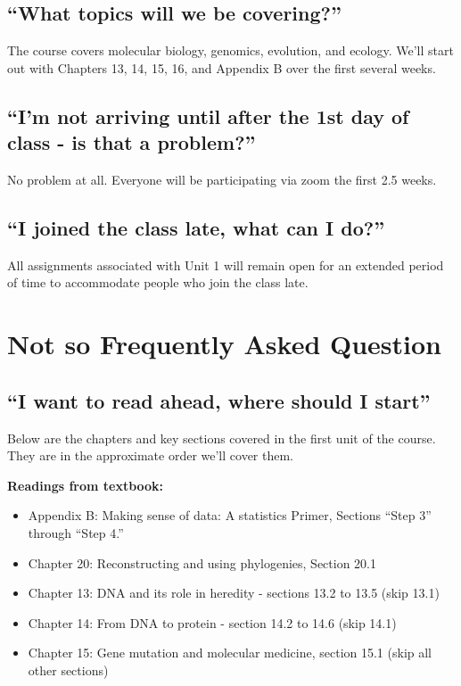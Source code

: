 \documentclass[
]{book}
\providecommand{\tightlist}{%
  \setlength{\itemsep}{0pt}\setlength{\parskip}{0pt}}
\begin{document}
\hypertarget{what-topics-will-we-be-covering}{%
\subsection{``What topics will we be covering?''}\label{what-topics-will-we-be-covering}}

The course covers molecular biology, genomics, evolution, and ecology. We'll start out with Chapters 13, 14, 15, 16, and Appendix B over the first several weeks.

\hypertarget{im-not-arriving-until-after-the-1st-day-of-class---is-that-a-problem}{%
\subsection{``I'm not arriving until after the 1st day of class - is that a problem?''}\label{im-not-arriving-until-after-the-1st-day-of-class---is-that-a-problem}}

No problem at all. Everyone will be participating via zoom the first 2.5 weeks.

\hypertarget{i-joined-the-class-late-what-can-i-do}{%
\subsection{``I joined the class late, what can I do?''}\label{i-joined-the-class-late-what-can-i-do}}

All assignments associated with Unit 1 will remain open for an extended period of time to accommodate people who join the class late.

\hypertarget{not-so-frequently-asked-question}{%
\section{Not so Frequently Asked Question}\label{not-so-frequently-asked-question}}

\hypertarget{i-want-to-read-ahead-where-should-i-start}{%
\subsection{``I want to read ahead, where should I start''}\label{i-want-to-read-ahead-where-should-i-start}}

Below are the chapters and key sections covered in the first unit of the course. They are in the approximate order we'll cover them.

\textbf{Readings from textbook:}

\begin{itemize}
\tightlist
\item
  Appendix B: Making sense of data: A statistics Primer, Sections ``Step 3'' through ``Step 4.''
\item
  Chapter 20: Reconstructing and using phylogenies, Section 20.1
\item
  Chapter 13: DNA and its role in heredity - sections 13.2 to 13.5 (skip 13.1)
\item
  Chapter 14: From DNA to protein - section 14.2 to 14.6 (skip 14.1)
\item
  Chapter 15: Gene mutation and molecular medicine, section 15.1 (skip all other sections)
\end{itemize}
\end{document}
